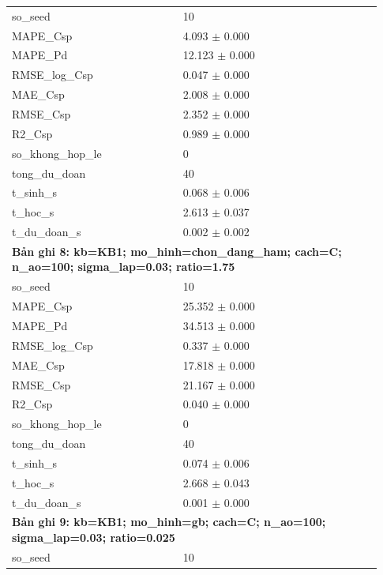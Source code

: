 \begin{longtable}{p{0.43\linewidth}p{0.50\linewidth}}
so\_\allowbreak seed & 10 \\
MAPE\_\allowbreak Csp & 4.093 $\pm$ 0.000 \\
MAPE\_\allowbreak Pd & 12.123 $\pm$ 0.000 \\
RMSE\_\allowbreak log\_\allowbreak Csp & 0.047 $\pm$ 0.000 \\
MAE\_\allowbreak Csp & 2.008 $\pm$ 0.000 \\
RMSE\_\allowbreak Csp & 2.352 $\pm$ 0.000 \\
R2\_\allowbreak Csp & 0.989 $\pm$ 0.000 \\
so\_\allowbreak khong\_\allowbreak hop\_\allowbreak le & 0 \\
tong\_\allowbreak du\_\allowbreak doan & 40 \\
t\_\allowbreak sinh\_\allowbreak s & 0.068 $\pm$ 0.006 \\
t\_\allowbreak hoc\_\allowbreak s & 2.613 $\pm$ 0.037 \\
t\_\allowbreak du\_\allowbreak doan\_\allowbreak s & 0.002 $\pm$ 0.002 \\
\midrule
\multicolumn{2}{p{0.95\linewidth}}{\textbf{Bản ghi 8: kb=KB1; mo\_hinh=chon\_dang\_ham; cach=C; n\_ao=100; sigma\_lap=0.03; ratio=1.75}} \\
so\_\allowbreak seed & 10 \\
MAPE\_\allowbreak Csp & 25.352 $\pm$ 0.000 \\
MAPE\_\allowbreak Pd & 34.513 $\pm$ 0.000 \\
RMSE\_\allowbreak log\_\allowbreak Csp & 0.337 $\pm$ 0.000 \\
MAE\_\allowbreak Csp & 17.818 $\pm$ 0.000 \\
RMSE\_\allowbreak Csp & 21.167 $\pm$ 0.000 \\
R2\_\allowbreak Csp & 0.040 $\pm$ 0.000 \\
so\_\allowbreak khong\_\allowbreak hop\_\allowbreak le & 0 \\
tong\_\allowbreak du\_\allowbreak doan & 40 \\
t\_\allowbreak sinh\_\allowbreak s & 0.074 $\pm$ 0.006 \\
t\_\allowbreak hoc\_\allowbreak s & 2.668 $\pm$ 0.043 \\
t\_\allowbreak du\_\allowbreak doan\_\allowbreak s & 0.001 $\pm$ 0.000 \\
\midrule
\multicolumn{2}{p{0.95\linewidth}}{\textbf{Bản ghi 9: kb=KB1; mo\_hinh=gb; cach=C; n\_ao=100; sigma\_lap=0.03; ratio=0.025}} \\
so\_\allowbreak seed & 10 \\

\end{longtable}
